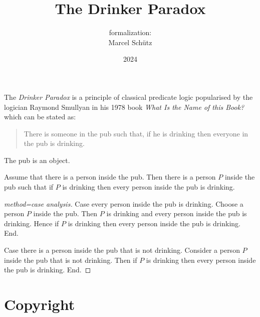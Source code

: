 \documentclass{article}
\title{The Drinker Paradox}
\author{\Naproche formalization:\\[0.5em]Marcel Schütz}
\date{2024}
\begin{document}
  \maketitle


  \noindent The \emph{Drinker Paradox} is a principle of classical predicate 
  logic popularised by the logician Raymond Smullyan in his 1978 book
  \textit{What Is the Name of this Book?} \cite{Smullyan1978} which can be 
  stated as:

  \begin{quotation}
    \noindent There is someone in the pub such that, if he is drinking then 
    everyone in the pub is drinking.
  \end{quotation}

  \begin{forthel}
    \begin{signature*}
      The pub is an object.
    \end{signature*}
    
    \begin{theorem*}[title=Drinker Paradox,id=drinker_paradox]
      Assume that there is a person inside the pub.
      Then there is a person $P$ inside the pub such that if $P$ is drinking then every person inside the pub is drinking.
    \end{theorem*}
    \begin{proof}[method=case analysis]
      Case every person inside the pub is drinking.
        Choose a person $P$ inside the pub.
        Then $P$ is drinking and every person inside the pub is drinking.
        Hence if $P$ is drinking then every person inside the pub is drinking.
      End.
    
      Case there is a person inside the pub that is not drinking.
        Consider a person $P$ inside the pub that is not drinking.
        Then if $P$ is drinking then every person inside the pub is drinking.
      End.
    \end{proof}
  \end{forthel}

  \printbibliography

  \section*{Copyright}
  \doclicenseThis
\end{document}
